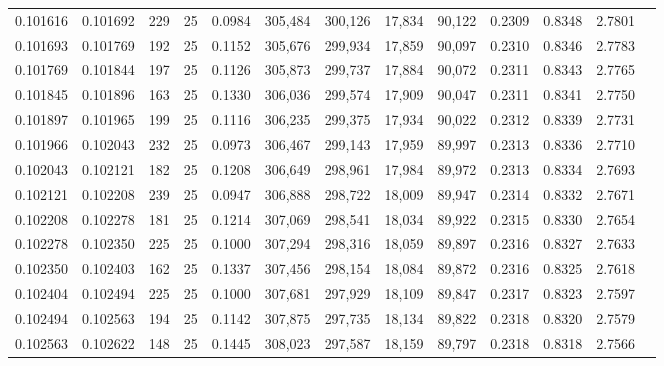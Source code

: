 \begin{tabular}{rrrrrrrrrrrrr}
0.101616 & 0.101692 &   229 &  25 &                                     0.0984 & 305,484 & 300,126 &  17,834 &  90,122 & 0.2309 & 0.8348 & 2.7801 \\
0.101693 & 0.101769 &   192 &  25 &                                     0.1152 & 305,676 & 299,934 &  17,859 &  90,097 & 0.2310 & 0.8346 & 2.7783 \\
0.101769 & 0.101844 &   197 &  25 &                                     0.1126 & 305,873 & 299,737 &  17,884 &  90,072 & 0.2311 & 0.8343 & 2.7765 \\
0.101845 & 0.101896 &   163 &  25 &                                     0.1330 & 306,036 & 299,574 &  17,909 &  90,047 & 0.2311 & 0.8341 & 2.7750 \\
0.101897 & 0.101965 &   199 &  25 &                                     0.1116 & 306,235 & 299,375 &  17,934 &  90,022 & 0.2312 & 0.8339 & 2.7731 \\
0.101966 & 0.102043 &   232 &  25 &                                     0.0973 & 306,467 & 299,143 &  17,959 &  89,997 & 0.2313 & 0.8336 & 2.7710 \\
0.102043 & 0.102121 &   182 &  25 &                                     0.1208 & 306,649 & 298,961 &  17,984 &  89,972 & 0.2313 & 0.8334 & 2.7693 \\
0.102121 & 0.102208 &   239 &  25 &                                     0.0947 & 306,888 & 298,722 &  18,009 &  89,947 & 0.2314 & 0.8332 & 2.7671 \\
0.102208 & 0.102278 &   181 &  25 &                                     0.1214 & 307,069 & 298,541 &  18,034 &  89,922 & 0.2315 & 0.8330 & 2.7654 \\
0.102278 & 0.102350 &   225 &  25 &                                     0.1000 & 307,294 & 298,316 &  18,059 &  89,897 & 0.2316 & 0.8327 & 2.7633 \\
0.102350 & 0.102403 &   162 &  25 &                                     0.1337 & 307,456 & 298,154 &  18,084 &  89,872 & 0.2316 & 0.8325 & 2.7618 \\
0.102404 & 0.102494 &   225 &  25 &                                     0.1000 & 307,681 & 297,929 &  18,109 &  89,847 & 0.2317 & 0.8323 & 2.7597 \\
0.102494 & 0.102563 &   194 &  25 &                                     0.1142 & 307,875 & 297,735 &  18,134 &  89,822 & 0.2318 & 0.8320 & 2.7579 \\
0.102563 & 0.102622 &   148 &  25 &                                     0.1445 & 308,023 & 297,587 &  18,159 &  89,797 & 0.2318 & 0.8318 & 2.7566 \\

\end{tabular}
